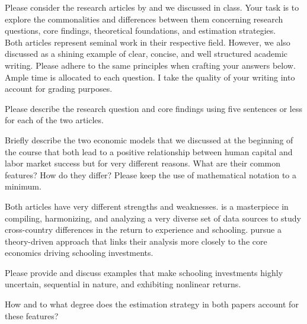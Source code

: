 \begin{boenumerate}
\newpage

\item Please consider the research articles by \citet{Lagakos.2018} and \citet{Keane.1997} we discussed in class.  Your task is to explore the commonalities and differences between them concerning research questions,  core findings,  theoretical foundations, and estimation strategies. \\

Both articles represent seminal work in their respective field.  However,  we also discussed \citet{Lagakos.2018} as a shining example of clear, concise, and well structured academic writing.  Please adhere to the same principles when crafting your answers below.  Ample time is allocated to each question.  I take the quality of your writing into account for grading purposes.

\begin{boenumerate}
\item Please describe the research question and core findings using five sentences or less for each of the two articles.
\item Briefly describe the two economic models that we discussed at the beginning of the course that both lead to a positive relationship between human capital and labor market success but for very different reasons.  What are their common features?  How do they differ?  Please keep the use of mathematical notation to a minimum.
\end{boenumerate}

Both articles have very different strengths and weaknesses. \citet{Lagakos.2018} is a masterpiece in compiling, harmonizing, and analyzing a very diverse set of data sources to study cross-country differences in the return to experience and schooling. \citet{Keane.1997} pursue a theory-driven approach that links their analysis more closely to the core economics driving schooling investments.

\begin{boenumerate}
\item  Please provide and discuss examples that make schooling investments highly uncertain, sequential in nature, and exhibiting nonlinear returns.
\item How and to what degree does the estimation strategy in both papers account for these features?
\end{boenumerate}
\end{boenumerate}